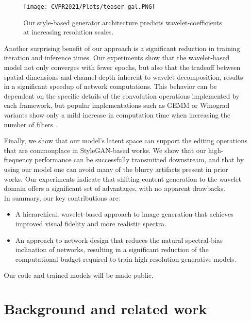 \documentclass[final]{CVPR2021/cvpr}
\begin{document}
\begin{figure}[t]
\begin{center}
\texttt{[image: CVPR2021/Plots/teaser\_gal.PNG]}
\end{center}
   \caption{ Our style-based generator architecture predicts wavelet-coefficients at increasing resolution scales. 
   }
\label{fig:Architecture}
\vspace{6pt}
\end{figure}

Another surprising benefit of our approach is a significant reduction in training iteration and inference times. Our experiments show that the wavelet-based model not only converges with fewer epochs, but also that the tradeoff between spatial dimensions and channel depth inherent to wavelet decomposition, results in a significant speedup of network computations. This behavior can be dependent on the specific details of the convolution operations implemented by each framework, but popular implementations such as GEMM or Winograd variants show only a mild \mbox{increase} in computation time when increasing the number of filters \citep{jorda2019performance}.

Finally, we show that our model's latent space can support the editing operations that are commonplace in StyleGAN-based works. We show that our high-frequency performance can be successfully transmitted downstream, and that by using our model one can avoid many of the blurry artifacts present in prior works. Our experiments \mbox{indicate} that shifting content generation to the wavelet \mbox{domain} offers a significant set of advantages, with no \mbox{apparent} drawbacks.
\\
In summary, our key contributions are:
\begin{itemize}
    \item A hierarchical, wavelet-based approach to image generation that achieves improved visual fidelity and more realistic \mbox{spectra}.
    \item An approach to network design that reduces the natural spectral-bias inclination of networks, resulting in a significant reduction of the computational budget required to train high resolution generative models.
\end{itemize}

Our code and trained models will be made public.
 
\section{Background and related work}
\label{sec:related}
\end{document}
